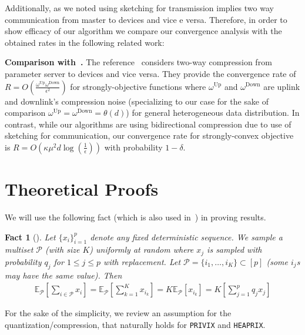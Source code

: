 \documentclass{article}
\newtheorem{fact}[theorem]{Fact}
\begin{document}
Additionally, as we noted using sketching for transmission implies two way communication from master to devices and vice e versa. Therefore, in order to show efficacy of our algorithm we compare our convergence analysis with the obtained rates in the following related work:

\textbf{Comparison with~\citet{philippenko2020artemis}.} 
The reference~\citep{philippenko2020artemis} considers two-way compression from parameter server to devices and vice versa. They provide the convergence rate of $R=O\left(\frac{\omega^{\text{Up}}\omega^{\text{Down}}}{\epsilon^2}\right)$ for strongly-objective functions where $\omega^{\text{Up}}$ and $\omega^{\text{Down}}$ are uplink and downlink's compression noise (specializing to our case for the sake of comparison $\omega^{\text{Up}}=\omega^{\text{Down}}=\theta\left(d\right)$) for general heterogeneous data distribution. In contrast, while our algorithms are using bidirectional compression due to use of sketching for communication, our convergence rate for strongly-convex objective is $R=O(\kappa\mu^2d\log\left(\frac{1}{\epsilon}\right))$ with probability $1-\delta$.  

\section{Theoretical Proofs}





We will use the following fact (which is also used in~\citet{li2019convergence,haddadpour2019convergence}) in proving results.
\begin{fact}[\citep{li2019convergence,haddadpour2019convergence}]\label{fact:1}
Let
$\{x_i\}_{i=1}^p$ denote any fixed deterministic sequence. We sample a multiset $\mathcal{P}$ (with size $K$) uniformly at random where $x_j$ is sampled  with probability $q_j$ for $1\leq j\leq p$ with replacement.  Let $\mathcal{P} = \{i_1,\ldots, i_K\} \subset[p]$ (some $i_j$s may have the same value). Then
\begin{align}
    \mathbb{E}_{\mathcal{P}}\left[\sum_{i\in \mathcal{P}}x_i\right]=\mathbb{E}_{\mathcal{P}}\left[\sum_{k=1}^Kx_{i_k}\right]=K\mathbb{E}_{\mathcal{P}}\left[x_{i_k}\right]=K\left[\sum_{j=1}^pq_jx_j\right]
\end{align}
\end{fact}
For the sake of the simplicity, we review an assumption for the quantization/compression, that naturally holds for \texttt{PRIVIX} and \texttt{HEAPRIX}.
\end{document}
